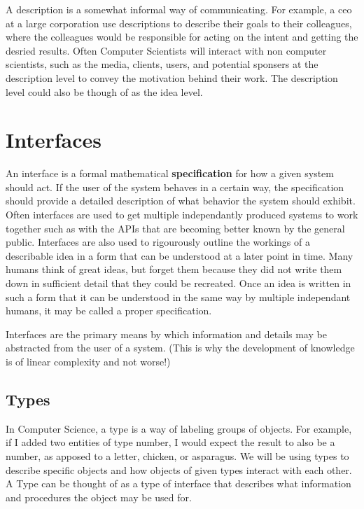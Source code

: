 \documentclass[12pt, letterpaper]{book}
\begin{document}
A description is a somewhat informal way of communicating. For example, a ceo at a large corporation use descriptions to describe their goals to their colleagues, where the colleagues would be responsible for acting on the intent and getting the desried results. Often Computer Scientists will interact with non computer scientists, such as the media, clients, users, and potential sponsers at the description level to convey the motivation behind their work. The description level could also be though of as the idea level.

\section{Interfaces}

An interface is a formal mathematical \textbf{specification} for how a given system should act. If the user of the system behaves in a certain way, the specification should provide a detailed description of what behavior the system should exhibit. Often interfaces are used to get multiple independantly produced systems to work together such as with the APIs that are becoming better known by the general public. Interfaces are also used to rigourously outline the workings of a describable idea in a form that can be understood at a later point in time. Many humans think of great ideas, but forget them because they did not write them down in sufficient detail that they could be recreated. Once an idea is written in such a form that it can be understood in the same way by multiple independant humans, it may be called a proper specification.

Interfaces are the primary means by which information and details may be abstracted from the user of a system. (This is why the development of knowledge is of linear complexity and not worse!)

	\subsection{Types}

		In Computer Science, a type is a way of labeling groups of objects. For example, if I added two entities of type number, I would expect the result to also be a number, as apposed to a letter, chicken, or asparagus. We will be using types to describe specific objects and how objects of given types interact with each other. A Type can be thought of as a type of interface that describes what information and procedures the object may be used for.
\end{document}
